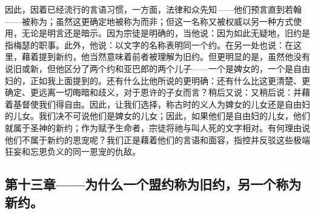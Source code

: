 因此，因着已经流行的言语习惯，一方面，法律和众先知——他们预言直到若翰——被称为；虽然这更确定地被称为而非；但这一名称又被权威以另一种方式使用，无论是明言还是暗示。因为宗徒是明确的，当他说：因为如此无疑地，旧约是指梅瑟的职事。此外，他说：以文字的名称表明同一个约。在另一处也说：在这里，藉着提到新约，他当然意味着前者被理解为旧约。但更明显的是，虽然他没有说旧或新，但他区分了两个约和亚巴郎的两个儿子——一个是婢女的，一个是自由妇的，正如我上面提到的。还有什么比他所说的更明确：还有什么比这更清楚、更确定、更远离一切晦暗和歧义，对于恩许的子女而言？稍后又说：又稍后说：并藉着基督使我们得自由。因此，让我们选择，称古时的义人为婢女的儿女还是自由妇的儿女。我们决不可说他们是婢女的儿女；因此，如果他们是自由妇的儿女，他们就属于圣神的新约；作为赋予生命者，宗徒将祂与叫人死的文字相对。有何理由说他们不属于新约的恩宠呢？我们正是藉着他们的言语和面容，指控并反驳这些极端狂妄和忘恩负义的同一恩宠的仇敌。\par


\subsection{第十三章——为什么一个盟约称为旧约，另一个称为新约。}

